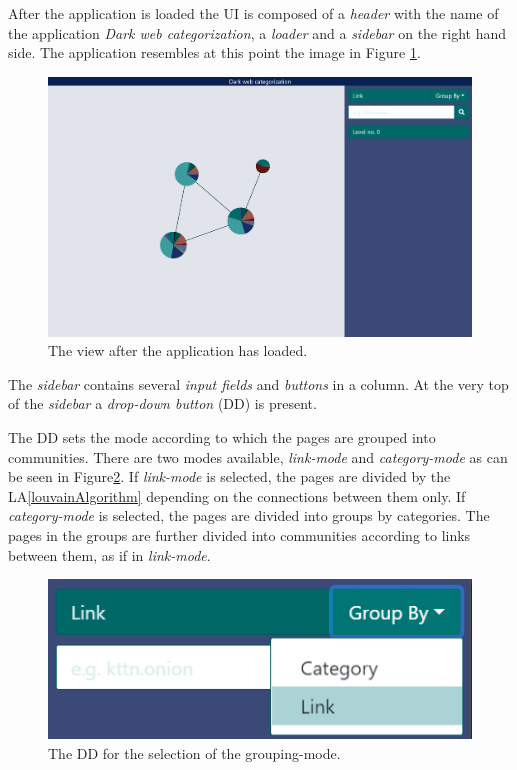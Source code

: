 After the application is loaded the UI is composed of a \textit{header} with the name of the application \textit{Dark web categorization}, a \textit{loader} and a \textit{sidebar} on the right hand side. The application resembles at this point the image in Figure \ref{zeroLevelGraphBasic}.
\begin{figure}[ht!]
  \centering
  \includegraphics[width=\textwidth]{Images/basic_view.png}
  \caption{The view after the application has loaded.}
  \label{zeroLevelGraphBasic}
\end{figure} 

The \textit{sidebar} contains several \textit{input fields} and \textit{buttons} in a column. At the very top of the \textit{sidebar} a \textit{drop-down button} (DD) is present. 

The DD sets the mode according to which the pages are grouped into communities. There are two modes available, \textit{link-mode} and \textit{category-mode} as can be seen in Figure\ref{modeDropdown}. If \textit{link-mode} is selected, the pages are divided by the LA\ref{louvainAlgorithm} depending on the connections between them only. If \textit{category-mode} is selected, the pages are divided into groups by categories. The pages in the groups are further divided into communities according to links between them, as if in \textit{link-mode}. 
\begin{figure}[ht!]
  \centering
  \includegraphics{Images/mode_dropdown.png}
  \caption{The DD for the selection of the grouping-mode.}
  \label{modeDropdown}
\end{figure} 

